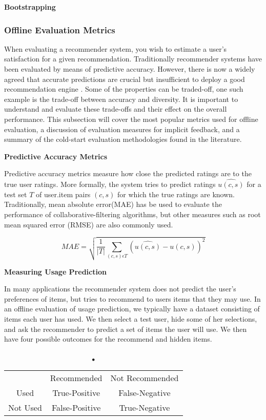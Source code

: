 \textbf{Bootstrapping}



\subsubsection{Offline Evaluation Metrics}

When evaluating a recommender system, you wish to estimate a user's satisfaction for a given recommendation. Traditionally recommender systems have been evaluated by means of predictive accuracy. However, there is now a widely agreed that accurate predictions are crucial but insufficient to deploy a good recommendation engine \cite{Shani2011, McNee2006}. Some of the properties can be traded-off, one such example is the trade-off between accuracy and diversity. It is important to understand and evaluate these trade-offs and their effect on the overall performance. This subsection will cover the most popular metrics used for offline evaluation, a discussion of evaluation measures for implicit feedback, and a summary of the cold-start evaluation methodologies found in the literature.

\textbf{Predictive Accuracy Metrics}

Predictive accuracy metrics measure how close the predicted ratings are to the true user ratings. More formally, the system tries to predict ratings $\hat{u(c,s)}$ for a test set $T$ of user.item pairs $(c, s)$ for which the true ratings are known. Traditionally, mean absolute error(MAE) has be used to evaluate the performance of collaborative-filtering algorithms, but other measures such as root mean squared error (RMSE) are also commonly used.

\begin{equation}
MAE = \sqrt{\frac{1}{\vert T \vert} \sum_{(c,s) \epsilon T}  (\hat{u(c,s)} - u(c,s))^{2}}
\end{equation}

\textbf{Measuring Usage Prediction}

In many applications the recommender system does not predict the user's preferences of items, but tries to recommend to users items that they may use. In an offline evaluation of usage prediction, we typically have a dataset consisting of items each user has used. We then select a test user, hide some of her selections, and ask the recommender to predict a set of items the user will use. We then have four possible outcomes for the recommend and hidden items.

\begin{table}
\caption{•}
\begin{tabular}{c c c}
\hline
			&	Recommended		&	Not Recommended \\
Used		&	True-Positive 	&	False-Negative	\\
Not Used	&	False-Positive	&	True-Negative	\\
\hline
\end{tabular}
\label{table:usageprediction}
\end{table}

